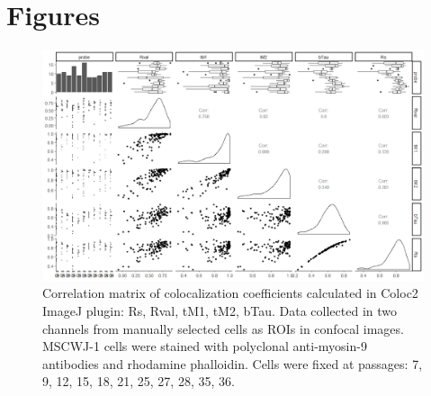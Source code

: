 \documentclass[num-refs]{wiley-article}
\begin{document}
\section{Figures}

\begin{figure}[hbt!]
  \includegraphics[width=1\linewidth]{supp1.jpeg}
  \caption{Correlation matrix of colocalization coefficients calculated in Coloc2 ImageJ plugin: Rs, Rval, tM1, tM2, bTau. Data collected in two channels from manually selected cells as ROIs in confocal images. MSCWJ-1 cells were stained with polyclonal anti-myosin-9 antibodies and rhodamine phalloidin. Cells were fixed at passages: 7, 9, 12, 15, 18, 21, 25, 27, 28, 35, 36.}
  \centering
\end{figure}
\end{document}
